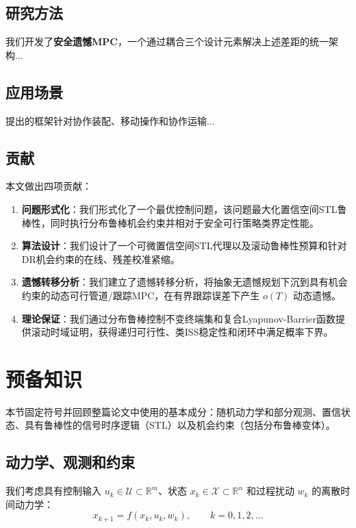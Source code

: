 \documentclass[12pt,a4paper]{ctexart}
\numberwithin{equation}{section}
\begin{document}
\subsection{研究方法}

我们开发了\textbf{安全遗憾MPC}，一个通过耦合三个设计元素解决上述差距的统一架构...

\subsection{应用场景}

提出的框架针对协作装配、移动操作和协作运输...

\subsection{贡献}

本文做出四项贡献：

\begin{enumerate}[label=(\arabic*)]
    \item \textbf{问题形式化}：我们形式化了一个最优控制问题，该问题最大化置信空间STL鲁棒性，同时执行分布鲁棒机会约束并相对于安全可行策略类界定性能。
    \item \textbf{算法设计}：我们设计了一个可微置信空间STL代理以及滚动鲁棒性预算和针对DR机会约束的在线、残差校准紧缩。
    \item \textbf{遗憾转移分析}：我们建立了遗憾转移分析，将抽象无遗憾规划下沉到具有机会约束的动态可行管道/跟踪MPC，在有界跟踪误差下产生 $o(T)$ 动态遗憾。
    \item \textbf{理论保证}：我们通过分布鲁棒控制不变终端集和复合Lyapunov-Barrier函数提供滚动时域证明，获得递归可行性、类ISS稳定性和闭环中满足概率下界。
\end{enumerate}

\clearpage
\section{预备知识}

本节固定符号并回顾整篇论文中使用的基本成分：随机动力学和部分观测、置信状态、具有鲁棒性的信号时序逻辑（STL）以及机会约束（包括分布鲁棒变体）。

\subsection{动力学、观测和约束}

我们考虑具有控制输入 $u_k\in\mathcal{U}\subset\mathbb{R}^{m}$、状态 $x_k\in\mathcal{X}\subset\mathbb{R}^{n}$ 和过程扰动 $w_k$ 的离散时间动力学：
\begin{equation}
    x_{k+1} = f(x_k,u_k,w_k), \qquad k=0,1,2,\dots
    \label{eq:dynamics}
\end{equation}
\end{document}
